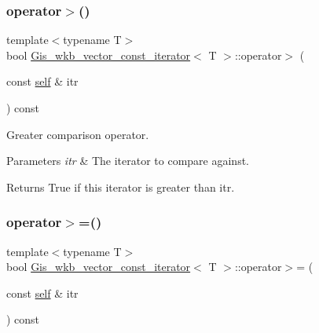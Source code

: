 \subsubsection{\texorpdfstring{operator$>$()}{operator>()}}
{\footnotesize\ttfamily template$<$typename T$>$ \\
bool \mbox{\hyperlink{classGis__wkb__vector__const__iterator}{Gis\+\_\+wkb\+\_\+vector\+\_\+const\+\_\+iterator}}$<$ T $>$\+::operator$>$ (\begin{DoxyParamCaption}\item[{const \mbox{\hyperlink{classGis__wkb__vector__const__iterator}{self}} \&}]{itr }\end{DoxyParamCaption}) const\hspace{0.3cm}{\ttfamily [inline]}}



Greater comparison operator. 


\begin{DoxyParams}{Parameters}
{\em itr} & The iterator to compare against. \\
\hline
\end{DoxyParams}
\begin{DoxyReturn}{Returns}
True if this iterator is greater than itr. 
\end{DoxyReturn}
\mbox{\label{classGis__wkb__vector__const__iterator_a0b98ce0b72b18f346bfb7b39f2ef0e03}} 
\subsubsection{\texorpdfstring{operator$>$=()}{operator>=()}}
{\footnotesize\ttfamily template$<$typename T$>$ \\
bool \mbox{\hyperlink{classGis__wkb__vector__const__iterator}{Gis\+\_\+wkb\+\_\+vector\+\_\+const\+\_\+iterator}}$<$ T $>$\+::operator$>$= (\begin{DoxyParamCaption}\item[{const \mbox{\hyperlink{classGis__wkb__vector__const__iterator}{self}} \&}]{itr }\end{DoxyParamCaption}) const\hspace{0.3cm}{\ttfamily [inline]}}



